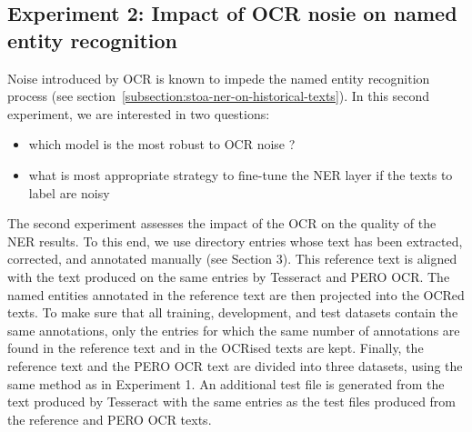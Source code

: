 \subsection{Experiment 2: Impact of OCR nosie on named entity recognition}
\label{subsection:experiment-2-setup}
Noise introduced by OCR is known to impede the named entity recognition process (see section~\ref{subsection:stoa-ner-on-historical-texts}).
In this second experiment, we are interested in two questions:
\begin{itemize}
    \item which model is the most robust to OCR noise ?
    \item what is most appropriate strategy to fine-tune the NER layer if the texts to label are noisy
\end{itemize}















The second experiment assesses the impact of the OCR on the quality of the NER results. To this end, we use directory entries whose text has been extracted, corrected, and annotated manually (see Section 3). This reference text is aligned with the text produced on the same entries by Tesseract and PERO OCR. The named entities annotated in the reference text are then projected into the OCRed texts. To make sure that all training, development, and test datasets contain the same annotations, only the entries for which the same number of annotations are found in the reference text and in the OCRised texts are kept. Finally, the reference text and the PERO OCR text are divided into three datasets, using the same method as in Experiment 1. An additional test file is generated from the text produced by Tesseract with the same entries as the test files produced from the reference and PERO OCR texts.




 

